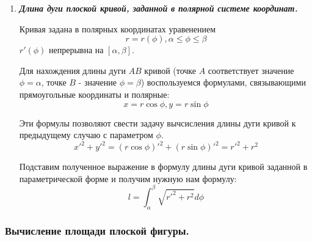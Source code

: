\documentclass[a4paper,12pt]{article}
\theoremstyle{plain} %
\theoremstyle{definition} %
\theoremstyle{remark} %
\begin{document}
\begin{enumerate}
	\item \textit{\textbf{Длина дуги плоской кривой, заданной в полярной системе координат.}}

	      Кривая задана в полярных координатах уравенением \[ r = r(\phi), \alpha \leq \phi \leq \beta \]
	      $r'(\phi)$ непрерывна на $[\alpha, \beta]$.

	      Для нахождения длины дуги $AB$ кривой (точке $A$ соответствует значение $\phi = \alpha$, точке $B$ - значение $\phi = \beta$) воспользуемся формулами, связывающими прямоугольные координаты и полярные:
	      \[ x = r \cos \phi, y = r \sin \phi \]

	      Эти формулы позволяют свести задачу вычсисления длины дуги кривой к предыдущему случаю с параметром $\phi$.
	      \[ x'^2 + y'^2 = (r \cos \phi)'^2 + (r \sin \phi)'^2 = r'^2 + r^2 \]

	      Подставим полученное выражение в формулу длины дуги кривой заданной в параметрической форме и получим нужную нам формулу:
	      \[ l = \int_\alpha^\beta \sqrt{r'^2 + r^2} d\phi \]


\end{enumerate}

\subsubsection*{Вычисление площади плоской фигуры.}
\end{document}

